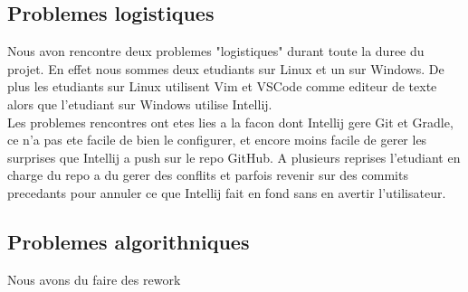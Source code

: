\subsection{Problemes logistiques}
Nous avon rencontre deux problemes "logistiques" durant toute la duree du projet.
En effet nous sommes deux etudiants sur Linux et un sur Windows.
De plus les etudiants sur Linux utilisent Vim et VSCode comme editeur de texte alors que l'etudiant sur Windows utilise Intellij.\\
Les problemes rencontres ont etes lies a la facon dont Intellij gere Git et Gradle, ce n'a pas ete facile de bien le configurer, et encore moins facile de gerer les surprises que Intellij a push sur le repo GitHub.
A plusieurs reprises l'etudiant en charge du repo a du gerer des conflits et parfois revenir sur des commits precedants pour annuler ce que Intellij fait en fond sans en avertir l'utilisateur.\\

\subsection{Problemes algorithniques}
Nous avons du faire des rework 
